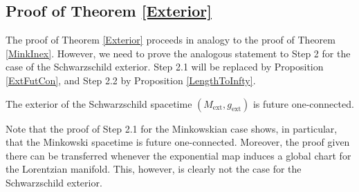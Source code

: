 \documentclass[reqno]{article}
\newcommand{\Mext}{M_{\mathrm{ext}}}
\newcommand{\gext}{g_{\mathrm{ext}}}
\begin{document}
\subsection{Proof of Theorem \ref{Exterior}}

The proof of Theorem \ref{Exterior} proceeds in analogy to the proof of Theorem \ref{MinkInex}. However, we need to prove the analogous statement to Step 2 for the case of the Schwarzschild exterior. Step 2.1 will be replaced by Proposition \ref{ExtFutCon}, and Step 2.2 by Proposition \ref{LengthToInfty}.

\begin{proposition}
\label{ExtFutCon}
The exterior of the Schwarzschild spacetime $(\Mext, \gext)$ is future one-connected.
\end{proposition}

Note that the proof of Step 2.1 for the Minkowskian case shows, in particular, that the Minkowski spacetime is future one-connected. Moreover, the proof given there can be transferred whenever the exponential map induces a global chart for the Lorentzian manifold. This, however, is clearly not the case for the Schwarzschild exterior. 
\end{document}
